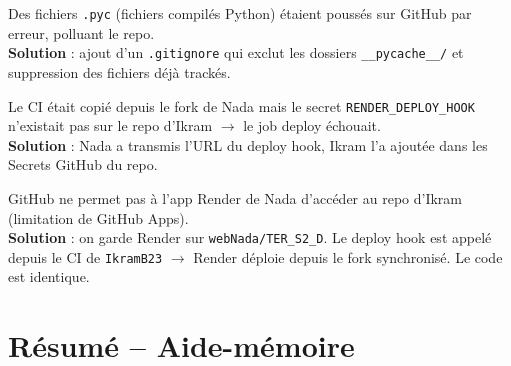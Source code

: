\documentclass[12pt,a4paper]{article}
\begin{document}
\begin{problemebox}[title=\textbf{Problème 3 : \texttt{\_\_pycache\_\_} dans le repo}]
Des fichiers \texttt{.pyc} (fichiers compilés Python) étaient poussés sur GitHub par erreur, polluant le repo.\\
\textbf{Solution} : ajout d'un \texttt{.gitignore} qui exclut les dossiers \texttt{\_\_pycache\_\_/} et suppression des fichiers déjà trackés.
\end{problemebox}

\begin{problemebox}[title=\textbf{Problème 4 : Deploy hook échoue sur IkramB23}]
Le CI était copié depuis le fork de Nada mais le secret \texttt{RENDER\_DEPLOY\_HOOK} n'existait pas sur le repo d'Ikram $\rightarrow$ le job deploy échouait.\\
\textbf{Solution} : Nada a transmis l'URL du deploy hook, Ikram l'a ajoutée dans les Secrets GitHub du repo.
\end{problemebox}

\begin{problemebox}[title=\textbf{Problème 5 : Render pointe sur le fork, pas sur IkramB23}]
GitHub ne permet pas à l'app Render de Nada d'accéder au repo d'Ikram (limitation de GitHub Apps).\\
\textbf{Solution} : on garde Render sur \texttt{webNada/TER\_S2\_D}. Le deploy hook est appelé depuis le CI de \texttt{IkramB23} $\rightarrow$ Render déploie depuis le fork synchronisé. Le code est identique.
\end{problemebox}

\section{Résumé -- Aide-mémoire}
\end{document}
